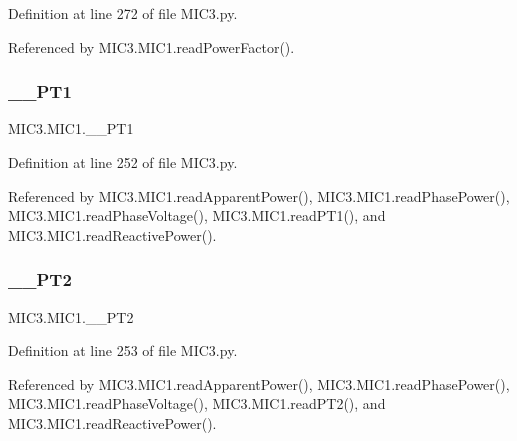 Definition at line 272 of file M\+I\+C3.\+py.



Referenced by M\+I\+C3.\+M\+I\+C1.\+read\+Power\+Factor().

\mbox{\label{class_m_i_c3_1_1_m_i_c1_a0202879a9a20c6db9fab96bf2bc2665a}} 
\subsubsection{\texorpdfstring{\+\_\+\+\_\+\+P\+T1}{\_\_PT1}}
{\footnotesize\ttfamily M\+I\+C3.\+M\+I\+C1.\+\_\+\+\_\+\+P\+T1\hspace{0.3cm}{\ttfamily [private]}}



Definition at line 252 of file M\+I\+C3.\+py.



Referenced by M\+I\+C3.\+M\+I\+C1.\+read\+Apparent\+Power(), M\+I\+C3.\+M\+I\+C1.\+read\+Phase\+Power(), M\+I\+C3.\+M\+I\+C1.\+read\+Phase\+Voltage(), M\+I\+C3.\+M\+I\+C1.\+read\+P\+T1(), and M\+I\+C3.\+M\+I\+C1.\+read\+Reactive\+Power().

\mbox{\label{class_m_i_c3_1_1_m_i_c1_a27404fde06ca91ba97fed1afe1305a4c}} 
\subsubsection{\texorpdfstring{\+\_\+\+\_\+\+P\+T2}{\_\_PT2}}
{\footnotesize\ttfamily M\+I\+C3.\+M\+I\+C1.\+\_\+\+\_\+\+P\+T2\hspace{0.3cm}{\ttfamily [private]}}



Definition at line 253 of file M\+I\+C3.\+py.



Referenced by M\+I\+C3.\+M\+I\+C1.\+read\+Apparent\+Power(), M\+I\+C3.\+M\+I\+C1.\+read\+Phase\+Power(), M\+I\+C3.\+M\+I\+C1.\+read\+Phase\+Voltage(), M\+I\+C3.\+M\+I\+C1.\+read\+P\+T2(), and M\+I\+C3.\+M\+I\+C1.\+read\+Reactive\+Power().

